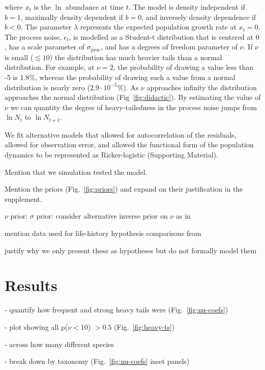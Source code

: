 \documentclass[11pt]{article}
\begin{document}
\noindent where $x_t$ is the $\ln$ abundance at time $t$. The model is density independent if $b = 1$, maximally density dependent if $b = 0$, and inversely density dependence if $b < 0$. The parameter $\lambda$ represents the expected population growth rate at $x_t = 0$. The process noise, $\epsilon_t$, is modelled as a Student-t distribution that is centered at $0$, has a scale parameter of $\sigma_\mathrm{proc}$, and has a degrees of freedom parameter of $\nu$. If $\nu$ is small ($\lesssim 10$) the distribution has much heavier tails than a normal distribution.  For example, at $\nu = 2$, the probability of drawing a value less than -5 is 1.8\%, whereas the probability of drawing such a value from a normal distribution is nearly zero ($2.9\cdot10^{-5}$\%). As $\nu$ approaches infinity the distribution approaches the normal distribution (Fig~\ref{fig:didactic}). By estimating the value of $\nu$ we can quantity the degree of heavy-tailedness in the process noise jumps from $\ln N_t$ to $\ln N_{t+1}$.

We fit alternative models that allowed for autocorrelation of the residuals, allowed for observation error, and allowed the functional form of the population dynamics to be represented as Ricker-logistic (Supporting Material).

Mention that we simulation tested the model.

Mention the priors (Fig.~\ref{fig:priors}) and expand on their justification in the supplement.

$\nu$ prior: \citep{fernandez1998}
$\sigma$ prior: \citep{gelman2006c}
consider alternative inverse prior on $\nu$ as in \citep{gelman2014}

mention data used for life-history hypothesis comparisons from \citet{brook2006a}

justify why we only present these as hypotheses but do not formally model them 

\section{Results}

- quantify how frequent and strong heavy tails were (Fig.~\ref{fig:nu-coefs})

- plot showing all p($\nu < 10$) $> 0.5$ (Fig.~\ref{fig:heavy-ts})

- across how many different species

- break down by taxonomy  (Fig.~\ref{fig:nu-coefs} inset panels)
\end{document}
